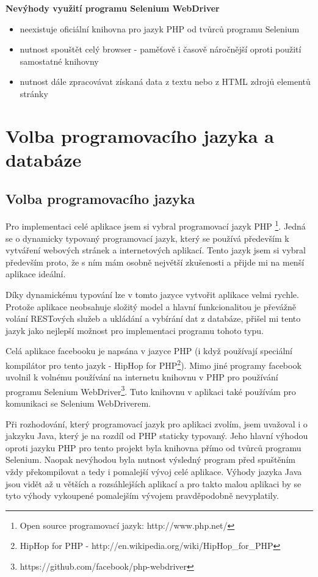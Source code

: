 \documentclass[thesis=M,czech]{FITthesis}[2013/05/10]
\begin{document}
\textbf{Nevýhody využití programu Selenium WebDriver}

\begin{itemize}
  \item neexistuje oficiální knihovna pro jazyk PHP 
  od tvůrců programu Selenium
  \item nutnost spouštět celý browser - paměťově i časově náročnější
  oproti použití samostatné knihovny
  \item nutnost dále zpracovávat získaná data z textu nebo z HTML zdrojů elementů stránky
\end{itemize}

\section{Volba programovacího jazyka a databáze}

\subsection{Volba programovacího jazyka}

Pro implementaci celé aplikace jsem si vybral programovací jazyk PHP \footnote{Open source programovací jazyk: http://www.php.net/}. Jedná se o dynamicky typovaný programovací jazyk, který se používá především k vytváření webových stránek a internetových aplikací. Tento jazyk jsem si vybral především proto, že s ním mám osobně největší zkušenosti a přijde mi na menší aplikace ideální. 

Díky dynamickému typování lze v tomto jazyce vytvořit aplikace velmi rychle. Protože aplikace neobsahuje složitý model a hlavní funkcionalitou je převážně volání RESTových služeb a ukládání a vybírání dat z databáze, přišel mi tento jazyk jako nejlepší možnost pro implementaci programu tohoto typu.

Celá aplikace facebooku je napsána v jazyce PHP (i když používají speciální kompilátor pro tento jazyk - HipHop for PHP\footnote{HipHop for PHP - http://en.wikipedia.org/wiki/HipHop\_for\_PHP}). Mimo jiné programy facebook uvolnil k volnému používání na internetu knihovnu v PHP pro používání programu Selenium WebDriver\footnote{https://github.com/facebook/php-webdriver}. Tuto knihovnu v aplikaci také používám pro komunikaci se Selenium WebDriverem.

Při rozhodování, který programovací jazyk pro aplikaci zvolím, jsem uvažoval i o jakzyku Java, který je na rozdíl od PHP staticky typovaný. Jeho hlavní výhodou oproti jazyku PHP pro tento projekt byla knihovna přímo od tvůrců programu Selenium. Naopak nevýhodou byla nutnost výsledný program před spuštěním vždy překompilovat a tedy i pomalejší vývoj celé aplikace. Výhody jazyka Java jsou vidět až u větších a rozsáhlejších aplikací a pro takto malou aplikaci by se tyto výhody vykoupené pomalejším vývojem pravděpodobně nevyplatily. 
\end{document}
